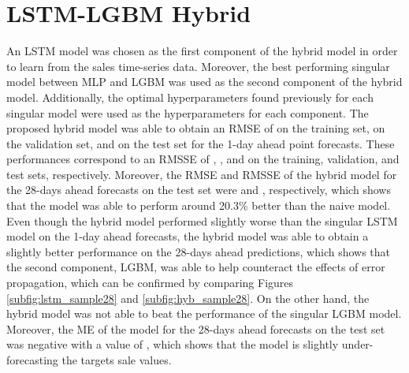 \section{LSTM-LGBM Hybrid}
An LSTM model was chosen as the first component of the hybrid model in order to learn from the sales time-series data. 
Moreover, the best performing singular model between MLP and LGBM was used as the second component of the hybrid model.
Additionally, the optimal hyperparameters found previously for each singular model were used as the hyperparameters for each component.
The proposed hybrid model was able to obtain an RMSE of \hybTrnRMSE{} on the training set, \hybValRMSE{} on the validation set, and \hybTstRMSE{} on the test set for the 1-day ahead point forecasts.
These performances correspond to an RMSSE of \hybTrnRMSSE{}, \hybValRMSSE{}, and \hybTstRMSSE{} on the training, validation, and test sets, respectively.
Moreover, the RMSE and RMSSE of the hybrid model for the 28-days ahead forecasts on the test set were \hybTstMonRMSE{} and \hybTstMonRMSSE{}, respectively, which shows that the model was able to perform around 20.3\% better than the naive model.
Even though the hybrid model performed slightly worse than the singular LSTM model on the 1-day ahead forecasts, the hybrid model was able to obtain a slightly better performance on the 28-days ahead predictions, which shows that the second component, LGBM, was able to help counteract the effects of error propagation, which can be confirmed by comparing Figures \ref{subfig:lstm_sample28} and \ref{subfig:hyb_sample28}. 
On the other hand, the hybrid model was not able to beat the performance of the singular LGBM model.
Moreover, the ME of the model for the 28-days ahead forecasts on the test set was negative with a value of \hybTstMonME{}, which shows that the model is slightly under-forecasting the targets sale values.